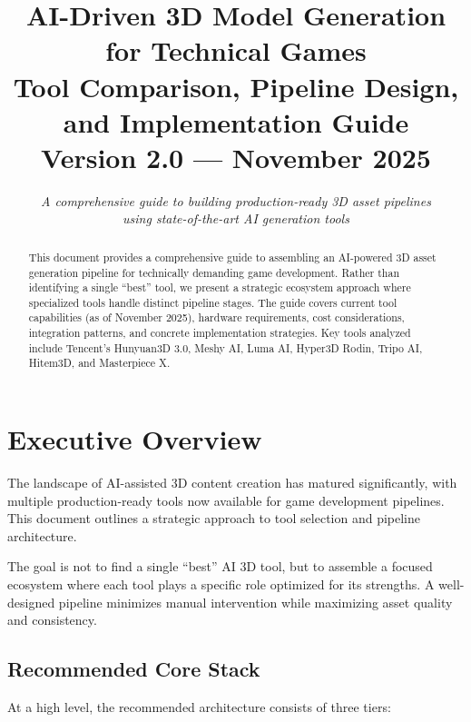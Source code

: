 \documentclass[11pt]{article}
\title{%
  \vspace{-1cm}
  \textcolor{primaryblue}{\textbf{AI-Driven 3D Model Generation for Technical Games}}\\[0.3cm]
  \large Tool Comparison, Pipeline Design, and Implementation Guide\\[0.2cm]
  \normalsize Version 2.0 --- November 2025
}
\author{%
  \textit{A comprehensive guide to building production-ready 3D asset pipelines}\\
  \textit{using state-of-the-art AI generation tools}
}
\date{}
\begin{document}
\maketitle
\thispagestyle{empty}

\begin{abstract}
\noindent This document provides a comprehensive guide to assembling an AI-powered 3D asset generation pipeline for technically demanding game development. Rather than identifying a single ``best'' tool, we present a strategic ecosystem approach where specialized tools handle distinct pipeline stages. The guide covers current tool capabilities (as of November 2025), hardware requirements, cost considerations, integration patterns, and concrete implementation strategies. Key tools analyzed include Tencent's Hunyuan3D 3.0, Meshy AI, Luma AI, Hyper3D Rodin, Tripo AI, Hitem3D, and Masterpiece X.
\end{abstract}

\vspace{0.5cm}
\tableofcontents
\newpage

\section{Executive Overview}

The landscape of AI-assisted 3D content creation has matured significantly, with multiple production-ready tools now available for game development pipelines. This document outlines a strategic approach to tool selection and pipeline architecture.

\begin{keypoint}
The goal is not to find a single ``best'' AI 3D tool, but to assemble a focused ecosystem where each tool plays a specific role optimized for its strengths. A well-designed pipeline minimizes manual intervention while maximizing asset quality and consistency.
\end{keypoint}

\subsection{Recommended Core Stack}

At a high level, the recommended architecture consists of three tiers:
\end{document}
